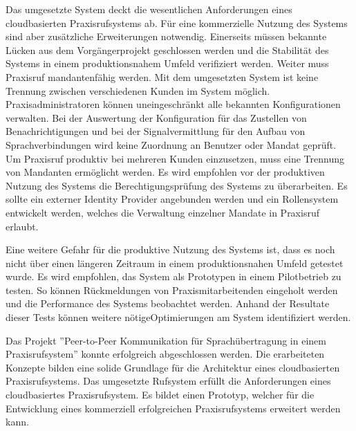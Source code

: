 Das umgesetzte System deckt die wesentlichen Anforderungen eines cloudbasierten Praxisrufsystems ab.
Für eine kommerzielle Nutzung des Systems sind aber zusätzliche Erweiterungen notwendig.
Einerseits müssen bekannte Lücken aus dem Vorgängerprojekt geschlossen werden und die Stabilität des Systems in einem produktionsnahem Umfeld verifiziert werden.
Weiter muss Praxisruf mandantenfähig werden.
Mit dem umgesetzten System ist keine Trennung zwischen verschiedenen Kunden im System möglich.
Praxisadministratoren können uneingeschränkt alle bekannten Konfigurationen verwalten.
Bei der Auswertung der Konfiguration für das Zustellen von Benachrichtigungen und bei der Signalvermittlung für den Aufbau von Sprachverbindungen wird keine Zuordnung an Benutzer oder Mandat geprüft.
Um Praxisruf produktiv bei mehreren Kunden einzusetzen, muss eine Trennung von Mandanten ermöglicht werden.
Es wird empfohlen vor der produktiven Nutzung des Systems die Berechtigungsprüfung des Systems zu überarbeiten.
Es sollte ein externer Identity Provider angebunden werden und ein Rollensystem entwickelt werden, welches die Verwaltung einzelner Mandate in Praxisruf erlaubt.

Eine weitere Gefahr für die produktive Nutzung des Systems ist, dass es noch nicht über einen längeren Zeitraum in einem produktionsnahen Umfeld getestet wurde.
Es wird empfohlen, das System als Prototypen in einem Pilotbetrieb zu testen.
So können Rückmeldungen von Praxismitarbeitenden eingeholt werden und die Performance des Systems beobachtet werden.
Anhand der Resultate dieser Tests können weitere nötigeOptimierungen am System identifiziert werden.

Das Projekt ''Peer-to-Peer Kommunikation für Sprachübertragung in einem Praxisrufsystem'' konnte erfolgreich abgeschlossen werden.
Die erarbeiteten Konzepte bilden eine solide Grundlage für die Architektur eines cloudbasierten Praxisrufsystems.
Das umgesetzte Rufsystem erfüllt die Anforderungen eines cloudbasiertes Praxisrufsystem.
Es bildet einen Prototyp, welcher für die Entwicklung eines kommerziell erfolgreichen Praxisrufsystems erweitert werden kann.

\clearpage
